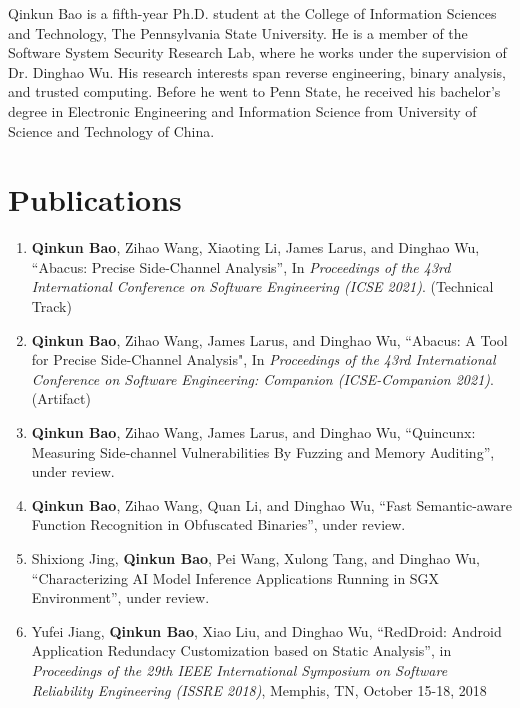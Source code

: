 
Qinkun Bao is a fifth-year Ph.D. student at the College of Information Sciences
and Technology, The Pennsylvania State University. He is a member of the Software 
System Security Research Lab, where he works under the supervision of Dr. Dinghao Wu.
His research interests span reverse engineering, binary analysis, and trusted computing. Before he went to Penn State, he received his bachelor's degree in Electronic Engineering and Information Science from University of Science and Technology of China.


  \section*{Publications}
  \begin{enumerate}
    \item \textbf{Qinkun Bao}, Zihao Wang, Xiaoting Li, James Larus, and Dinghao Wu, ``Abacus: Precise Side-Channel Analysis'', In \emph{Proceedings of the 43rd International Conference on Software Engineering (ICSE 2021)}. (Technical Track)
    \item \textbf{Qinkun Bao}, Zihao Wang, James Larus, and Dinghao Wu, ``Abacus: A Tool for Precise Side-Channel Analysis", In \emph{Proceedings of the 43rd International Conference on Software Engineering: Companion (ICSE-Companion 2021)}. (Artifact)
    
    \item \textbf{Qinkun Bao}, Zihao Wang, James Larus, and Dinghao Wu, ``Quincunx: Measuring Side-channel Vulnerabilities
    By Fuzzing and Memory Auditing'', under review.

    \item \textbf{Qinkun Bao}, Zihao Wang, Quan Li, and Dinghao Wu, ``Fast Semantic-aware Function Recognition in Obfuscated Binaries'', under review.
    
    \item Shixiong Jing, \textbf{Qinkun Bao}, Pei Wang, Xulong Tang, and Dinghao Wu, ``Characterizing AI Model Inference Applications Running in SGX Environment'', under review.
    
    \item Yufei Jiang, \textbf{Qinkun Bao}, Xiao Liu, and Dinghao Wu, ``RedDroid: Android Application Redundacy Customization based on Static Analysis'', in \emph{Proceedings of the 29th IEEE International Symposium on Software Reliability Engineering (ISSRE 2018)}, Memphis, TN, October 15-18, 2018
 

\end{enumerate}
